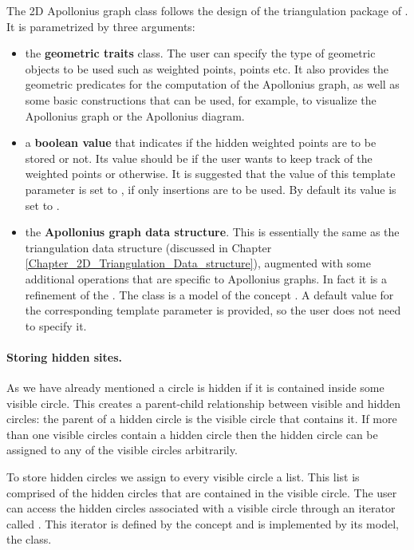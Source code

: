 The 2D Apollonius graph class
follows the design of the triangulation package of \cgal. It is
parametrized by three arguments:
\begin{itemize}
\item the {\bf geometric traits} class. The user can specify the
  type of geometric objects to be used such as weighted points, points
  etc. It also provides the geometric predicates for the computation
  of the Apollonius graph, as well as some basic constructions that
  can be used, for example, to visualize the Apollonius graph or the
  Apollonius diagram.
\item a {\bf boolean value} that indicates if the hidden weighted
  points are to be stored or not. Its value should be  if the
  user wants to keep track of the weighted points or 
  otherwise. It is suggested that the value of this template parameter
  is set to , if only insertions are to be used. By default
  its value is set to .
\item the {\bf Apollonius graph data structure}. This is essentially
  the same as the triangulation data structure (discussed in Chapter
  \ref{Chapter_2D_Triangulation_Data_structure}), augmented with some
  additional operations that are specific to Apollonius graphs. In
  fact it is a refinement of the
  . The class
   is a model of
  the concept . A default value
  for the corresponding template parameter is provided, so the user
  does not need to specify it.
\end{itemize}

\paragraph{Storing hidden sites.}
As we have already mentioned a circle is hidden if it is contained
inside some visible circle. This creates a parent-child relationship
between visible and hidden circles: the parent of a hidden circle is the
visible circle that contains it. If more than one visible circles
contain a hidden circle then the hidden circle can be assigned to any of
the visible circles arbitrarily.

To store hidden circles we assign to every visible circle a list. This
list is comprised of the hidden circles that are contained in the
visible circle. The user can access the hidden circles associated with
a visible circle through an iterator called
. This iterator is defined by the
 concept and is implemented by its
model, the  class.



